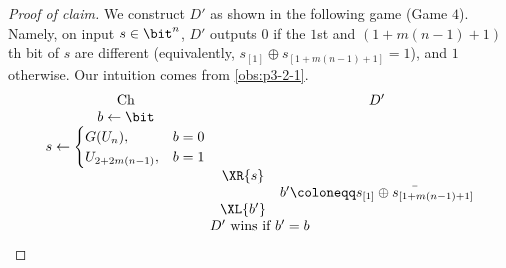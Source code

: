 \begin{answer}[ii]
\begin{proof}[Proof of claim]
    We construct $D'$ as shown in the following game (Game $4$). Namely, on input $s\in\bit^n$, $D'$ outputs $0$ if the $1$st and $(1+m(n-1)+1)$th bit of $s$ are different (equivalently, $s_{[1]}\oplus s_{[1+m(n-1)+1]}=1$), and $1$ otherwise. Our intuition comes from \autoref{obs:p3-2-1}.
    {
        \[
            \begin{array}{@{} c c c @{}}
            \text{Ch} & & D' \\
            b \leftarrow \bit & & \\
            s \leftarrow \begin{cases} 
                G(U_n), &b = 0 \\
                U_{2+2m(n-1)}, &b = 1 
            \end{cases} & & \\
            & \XR{s} & \\
            & & b'\coloneqq \bar{s_{[1]}\oplus s_{[1+m(n-1)+1]}} \\
            & \XL{b'} & \\
            \multicolumn{3}{c}{\text{$D'$ wins if $b' = b$}}
        \end{array}
        \]
        \label{fig:p3-game4}
    }
    

\end{proof}
\end{answer}
